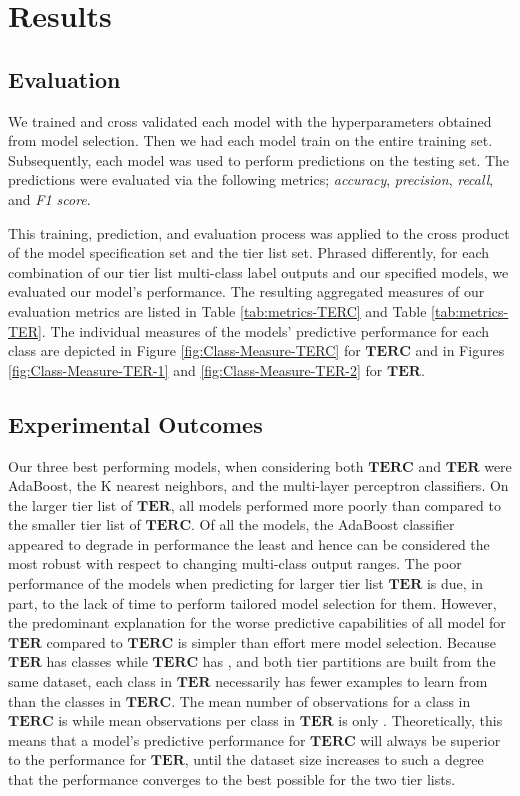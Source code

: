 \documentclass{article}
\newcommand{\Qty}[1]{\oldstylenums{#1}}
\newcommand{\TER}{\ensuremath{\mathbf{TER}}\xspace}
\newcommand{\TERC}{\ensuremath{\mathbf{TERC}}\xspace}
\begin{document}
\hypertarget{results}{%
\section{Results}}


\hypertarget{evaluation}{%
\subsection{Evaluation}}

We trained and cross validated each model with the hyperparameters obtained from model selection.
Then we had each model train on the entire training set.
Subsequently, each model was used to perform predictions on the testing set.
The predictions were evaluated via the following metrics; \emph{accuracy}, \emph{precision}, \emph{recall}, and \emph{F1 score}.

This training, prediction, and evaluation process was applied to the cross product of the model specification set and the tier list set.
Phrased differently, for each combination of our \Qty{2} tier list multi-class label outputs and our \Qty{9} specified models, we evaluated our model's performance.
The resulting aggregated measures of our evaluation metrics are listed in Table \ref{tab:metrics-TERC} and Table \ref{tab:metrics-TER}.
The individual measures of the models' predictive performance for each class are depicted in Figure \ref{fig:Class-Measure-TERC} for \TERC and in Figures \ref{fig:Class-Measure-TER-1} and \ref{fig:Class-Measure-TER-2} for \TER.


\hypertarget{experimental-outcomes}{%
\subsection{Experimental Outcomes}}

Our three best performing models, when considering both \TERC and \TER were AdaBoost, the K nearest neighbors, and the multi-layer perceptron classifiers.
On the larger tier list of \TER, all models performed more poorly than compared to the smaller tier list of \TERC.
Of all the models, the AdaBoost classifier appeared to degrade in performance the least and hence can be considered the most robust with respect to changing multi-class output ranges.
The poor performance of the models when predicting for larger tier list \TER is due, in part, to the lack of time to perform tailored model selection for them.
However, the predominant explanation for the worse predictive capabilities of all model for \TER compared to \TERC is simpler than effort mere model selection.
Because \TER has \Qty{22} classes while \TERC has \Qty{12}, and both tier partitions are built from the same dataset, each class in \TER necessarily has fewer examples to learn from than the classes in \TERC.
The mean number of observations for a class in \TERC is \Qty{115} while mean observations per class in \TER is only \Qty{63}.
Theoretically, this means that a model's predictive performance for \TERC will always be superior to the performance for \TER, until the dataset size increases to such a degree that the performance converges to the best possible for the two tier lists.
\end{document}
